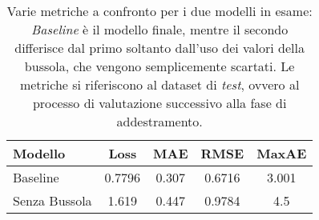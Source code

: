 \begin{table}[htp]
  \centering
  \begin{tabular}{lcccc}
    \toprule
    Modello & Loss & MAE & RMSE & MaxAE \\
    \midrule
    Baseline      & 0.7796 & 0.307 & 0.6716 & 3.001 \\
    Senza Bussola & 1.619 & 0.447 & 0.9784 & 4.5 \\
    \bottomrule
  \end{tabular}
  \caption{Varie metriche a confronto per i due modelli in esame:
    \emph{Baseline} è il modello finale, mentre il secondo differisce dal primo
    soltanto dall'uso dei valori della bussola, che vengono semplicemente
    scartati. Le metriche si riferiscono al dataset di \emph{test}, ovvero al
    processo di valutazione successivo alla fase di addestramento.}%
  \label{tab:nocompass}%
\end{table}
